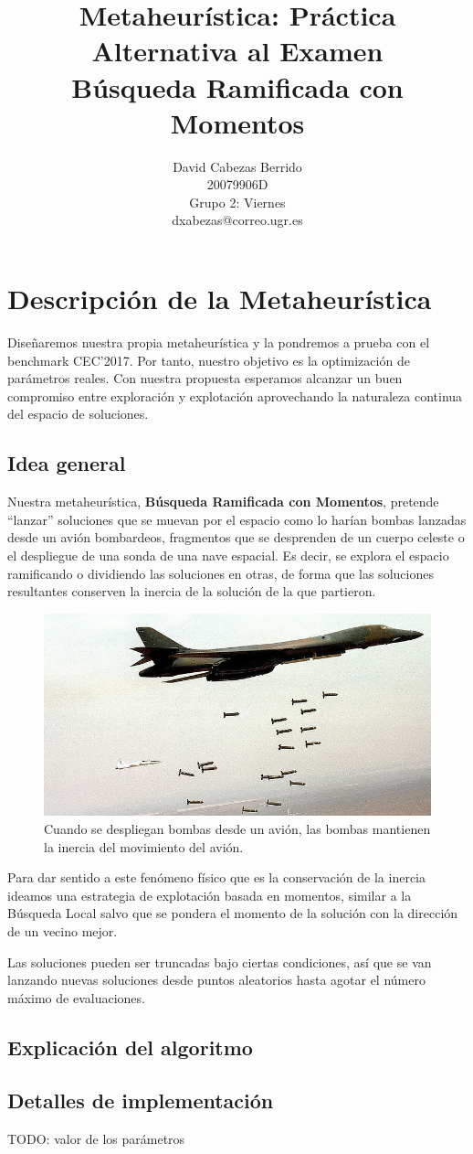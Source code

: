 \documentclass{article}
\title{\Huge Metaheurística: Práctica Alternativa al Examen \\ Búsqueda Ramificada con Momentos \vspace{10mm}}
\author{\huge David Cabezas Berrido \vspace{10mm} \\
	\huge 20079906D \vspace{10mm} \\  
  \huge Grupo 2: Viernes \vspace{10mm} \\ 
  \huge dxabezas@correo.ugr.es \vspace{10mm}}
\begin{document}
\maketitle
\newpage
\tableofcontents
\newpage

\section{Descripción de la Metaheurística}

Diseñaremos nuestra propia metaheurística y la pondremos a prueba con el benchmark CEC'2017. Por tanto, nuestro objetivo es la optimización de parámetros
reales. Con nuestra propuesta esperamos alcanzar un buen compromiso entre exploración y explotación aprovechando la naturaleza continua del espacio
de soluciones.

\subsection{Idea general}
Nuestra metaheurística, \textbf{Búsqueda Ramificada con Momentos}, pretende ``lanzar'' soluciones que se muevan por el espacio como lo harían bombas
lanzadas desde un avión bombardeos, fragmentos que se desprenden de un cuerpo celeste o el despliegue de una sonda de una nave espacial.
Es decir, se explora el espacio ramificando o dividiendo las soluciones en otras, de
forma que las soluciones resultantes conserven la inercia de la solución de la que partieron.

\begin{figure}[H]
	\centering
	\includegraphics[width=140mm]{imgs/bombs}
	\caption{Cuando se despliegan bombas desde un avión, las bombas mantienen la inercia del movimiento del avión.}
\end{figure}

Para dar sentido a este fenómeno físico que es la conservación de la inercia ideamos una estrategia de explotación basada en momentos, similar
a la Búsqueda Local salvo que se pondera el momento de la solución con la dirección de un vecino mejor.

Las soluciones pueden ser truncadas bajo ciertas
condiciones, así que se van lanzando nuevas soluciones desde puntos aleatorios hasta agotar el número máximo de evaluaciones.

\subsection{Explicación del algoritmo}

\subsection{Detalles de implementación}
TODO: valor de los parámetros
\end{document}
